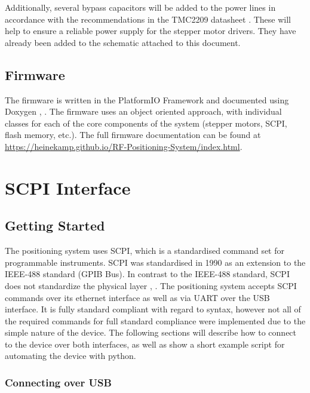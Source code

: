 Additionally, several bypass capacitors will be added to the power lines in accordance with the recommendations in the TMC2209 datasheet \cite{trinamic_motion_control_gmbh__co_kg_tc2209_2016}. These will help to ensure a reliable power supply for the stepper motor drivers. They have already been added to the schematic attached to this document.

\subsection{Firmware}
The firmware is written in the PlatformIO Framework and documented using Doxygen \cite{platformio_labs_platformio_nodate}, \cite{van_heesch_doxygen_nodate}. The firmware uses an object oriented approach, with individual classes for each of the core components of the system (stepper motors, SCPI, flash memory, etc.). The full firmware documentation can be found at \url{https://heinekamp.github.io/RF-Positioning-System/index.html}.

\newpage

\section{SCPI Interface}

\subsection{Getting Started}

The positioning system uses SCPI, which is a standardised command set for programmable instruments. SCPI was standardised in 1990 as an extension to the IEEE-488 standard (GPIB Bus). In contrast to the IEEE-488 standard, SCPI does not standardize the physical layer \cite{scpi_consortium_standard_1999}, \cite{noauthor_ieee_1987}. The positioning system accepts SCPI commands over its ethernet interface as well as via UART over the USB interface. It is fully standard compliant with regard to syntax, however not all of the required commands for full standard compliance were implemented due to the simple nature of the device. The following sections will describe how to connect to the device over both interfaces, as well as show a short example script for automating the device with python.

\subsubsection{Connecting over USB}

